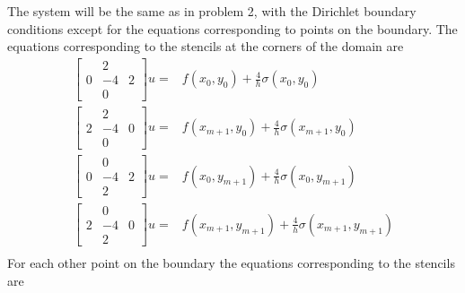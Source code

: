 \documentclass[12pt]{article}
\begin{document}
The system will be the same as in problem 2, with the Dirichlet boundary conditions except for the equations corresponding to points on the boundary. The equations corresponding to the stencils at the corners of the domain are 
\begin{align*}
\begin{bmatrix}&2&\\0&-4&2\\&0&\end{bmatrix}u =& f(x_0,y_0) + \frac{4}{h} \sigma(x_0, y_0) \tag{South-West} \\
\begin{bmatrix}&2&\\2&-4&0\\&0&\end{bmatrix}u =& f(x_{m+1},y_0) + \frac{4}{h} \sigma(x_{m+1}, y_0) \tag{South-East} \\
\begin{bmatrix}&0&\\0&-4&2\\&2&\end{bmatrix}u =& f(x_0,y_{m+1}) + \frac{4}{h} \sigma(x_0, y_{m+1}) \tag{North-West} \\
\begin{bmatrix}&0&\\2&-4&0\\&2&\end{bmatrix}u =& f(x_{m+1},y_{m+1}) + \frac{4}{h} \sigma(x_{m+1}, y_{m+1}) \tag{North-East} \\
\end{align*} 
For each other point on the boundary the equations corresponding to the stencils are
\end{document}
